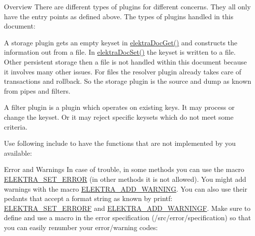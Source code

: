 \begin{DoxyParagraph}{Overview}
There are different types of plugins for different concerns. They all only have the entry points as defined above. The types of plugins handled in this document\+:
\begin{DoxyItemize}
\item A storage plugin gets an empty keyset in \mbox{\hyperlink{group__plugin_gacb69f3441c6d84241b4362f958fbe313}{elektra\+Doc\+Get()}} and constructs the information out from a file. In \mbox{\hyperlink{group__plugin_gae65781a1deb34efc79c8cb9d9174842c}{elektra\+Doc\+Set()}} the keyset is written to a file. ~\newline
 Other persistent storage then a file is not handled within this document because it involves many other issues. For files the resolver plugin already takes care of transactions and rollback. So the storage plugin is the source and dump as known from pipes and filters.
\item A filter plugin is a plugin which operates on existing keys. It may process or change the keyset. Or it may reject specific keysets which do not meet some criteria.
\end{DoxyItemize}
\end{DoxyParagraph}
Use following include to have the functions that are not implemented by you available\+:


\begin{DoxyCodeInclude}{0}
\end{DoxyCodeInclude}
 \begin{DoxyParagraph}{Error and Warnings}
In case of trouble, in some methods you can use the macro \mbox{\hyperlink{group__plugin_gaab1842b82272e6d4235b6a71587a64d9}{E\+L\+E\+K\+T\+R\+A\+\_\+\+S\+E\+T\+\_\+\+E\+R\+R\+OR}} (in other methods it is not allowed). You might add warnings with the macro \mbox{\hyperlink{group__plugin_ga3da3bdb0f41710adda9eee3d7adac9ff}{E\+L\+E\+K\+T\+R\+A\+\_\+\+A\+D\+D\+\_\+\+W\+A\+R\+N\+I\+NG}}. You can also use their pedants that accept a format string as known by printf\+: \mbox{\hyperlink{group__plugin_ga3e4fc2c20d8e64bed7a54bb1af882e34}{E\+L\+E\+K\+T\+R\+A\+\_\+\+S\+E\+T\+\_\+\+E\+R\+R\+O\+RF}} and \mbox{\hyperlink{group__plugin_ga2bbb3bc3a3bdaf5b34b52de81886a098}{E\+L\+E\+K\+T\+R\+A\+\_\+\+A\+D\+D\+\_\+\+W\+A\+R\+N\+I\+N\+GF}}. Make sure to define and use a macro in the error specification (/src/error/specification) so that you can easily renumber your error/warning codes\+:
\end{DoxyParagraph}

